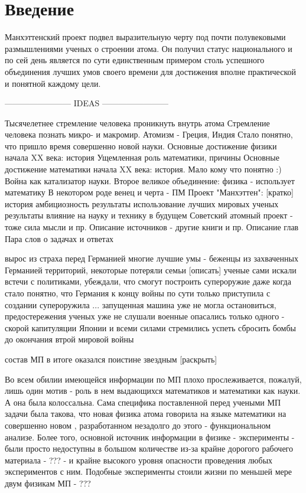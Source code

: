 \chapter*{Введение}

Манхэттенский проект подвел выразительную черту под почти полувековыми размышлениями ученых о строении атома.
Он получил статус национального и по сей день является по сути единственным примером столь успешного объединения лучших умов своего времени для достижения вполне практической и понятной каждому цели.




------------------------ IDEAS ------------------------ 

Тысячелетнее стремление человека проникнуть внутрь атома
Стремление человека познать микро- и макромир. Атомизм - Греция, Индия
Стало понятно, что пришло время совершенно новой науки.
Основные достижение физики начала XX века: история
Ущемленная роль математики, причины 
Основные достижение математики начала XX века: история. Мало кому что понятно :)
Война как катализатор науки.
Второе великое объединение: физика - использует математику
В некотором роде венец и черта - ПМ
Проект "Манхэттен": [кратко]
    история
    амбициозность
    результаты
    использование лучших мировых ученых
    результаты
    влияние на науку и технику в будущем
Советский атомный проект - тоже сила мысли и пр.
Описание источников - другие книги и пр.
Описание глав
Пара слов о задачах и ответах



вырос из страха перед Германией
многие лучшие умы - беженцы из захваченных Германией территорий, некоторые потеряли семьи [описать]
ученые сами искали встечи с политиками, убеждали, что смогут построить супероружие
даже когда стало понятно, что Германия к концу войны по сути только приступила с создании супероружила ...  запущенная машина уже не могла остановиться, предостережения ученых уже не слушали
военные опасались только  одного - скорой капитуляции Японии и всеми силами стремились успеть сбросить бомбы до окончания втрой мировой войны

состав МП в итоге оказался поистине звездным [раскрыть]

Во всем обилии имеющейся информации по МП плохо прослеживается, пожалуй, лишь один мотив - роль в нем выдающихся математиков и математики как науки.
А она была колоссальна.
Сама специфика поставленной перед учеными МП задачи была такова, что новая физика атома говорила на языке математики на совершенно новом , разработанном незадолго до этого - функциональном анализе.
Более того, основной источник информации в физике - эксперименты - были просто недоступны в большом количестве из-за крайне дорогого рабочего материала - ??? - 
и крайне высокого уровня опасности проведения любых экспериментов с ним. Подобные эксперименты стоили жизни по меньшей мере двум физикам МП - ???

